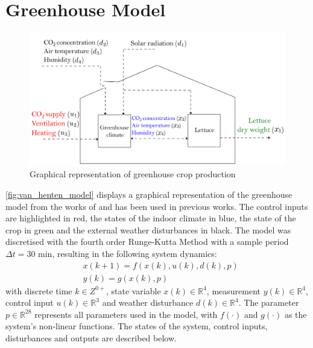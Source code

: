 \section{Greenhouse Model}
\begin{figure}[H]
	\centering
	\includegraphics[width = \linewidth]{figures/van_henten_model.png}
	\caption{Graphical representation of greenhouse crop production \cite{hentenGreenhouseClimateManagement1994}}
	\label{fig:van_henten_model}
\end{figure}


\autoref{fig:van_henten_model} displays a graphical representation of the greenhouse model from the works of \citet{hentenGreenhouseClimateManagement1994} and has been used in previous works\cite{morcegoReinforcementLearningModel2023,lubbersAutonomousGreenhouseClimate2023, boersmaRobustSamplebasedModel2022}. The control inputs are highlighted in red, the states of the indoor climate in blue, the state of the crop in green and the external weather disturbances in black. The model was discretised with the fourth order Runge-Kutta Method with a sample period $\Delta t = 30$ min, resulting in the following system dynamics:
\begin{equation}\label{eq:greenhouse_model_discrete}
	\begin{aligned}
		& x(k+1) = f(x(k),u(k),d(k),p) \\
		& y(k) = g(x(k),p)
	\end{aligned}
\end{equation}
with discrete time $k \in Z^{0+}$, state variable $x(k) \in \mathbb{R}^4$, measurement $y(k) \in \mathbb{R}^4$, control input $u(k) \in \mathbb{R}^3$ and weather disturbance $d(k) \in \mathbb{R}^4$. The parameter $p \in \mathbb{R}^{28}$ represents all parameters used in the model, with $f(\cdot)$ and $g(\cdot)$ as the system's non-linear functions. The states of the system, control inputs, disturbances and outputs are described below.

